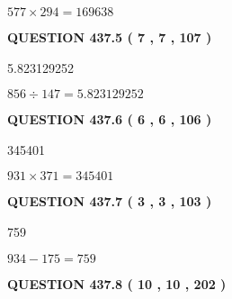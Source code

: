 \documentclass{ctexart}
\begin{document}
 
 
 
\noindent{}

$ %
577 \times  %
294=   %
169638$
 
 
  
\vspace{0.2in}
  
{\textbf{\Large{QUESTION
437.5 
 ( 7 , 7 , 107 )
}}}
  
  
 
 
\noindent{}

5.823129252
 
 
 
 
\noindent{}

$ %
856 \div  %
147=   %
5.823129252$
 
 
  
\vspace{0.2in}
  
{\textbf{\Large{QUESTION
437.6 
 ( 6 , 6 , 106 )
}}}
  
  
 
 
\noindent{}

345401
 
 
 
 
\noindent{}

$ %
931 \times  %
371=   %
345401$
 
 
  
\vspace{0.2in}
  
{\textbf{\Large{QUESTION
437.7 
 ( 3 , 3 , 103 )
}}}
  
  
 
 
\noindent{}

759
 
 
 
 
\noindent{}

$ %
934 -  %
175=   %
759$
 
 
  
\vspace{0.2in}
  
{\textbf{\Large{QUESTION
437.8 
 ( 10 , 10 , 202 )
}}}
  
\end{document}
